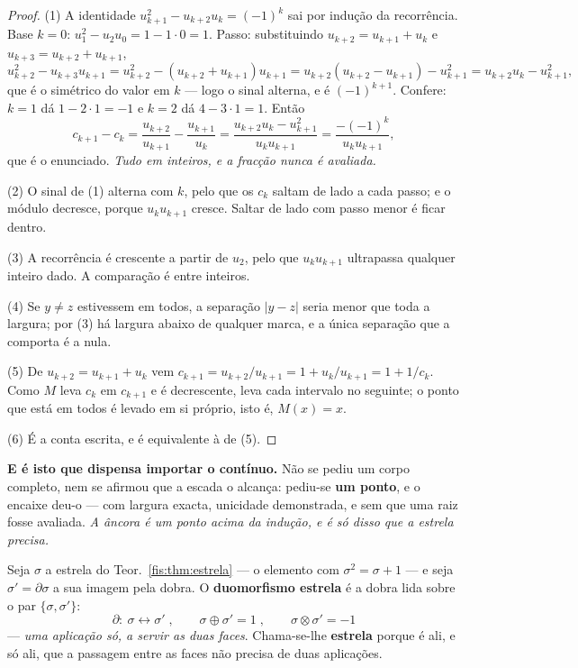 \documentclass[livro.tex]{subfiles}
\begin{document}
\begin{proof}
(1) A identidade $u_{k+1}^{2}-u_{k+2}u_{k}=(-1)^{k}$ sai por indução da
recorrência. Base $k=0$: $u_1^{2}-u_2u_0=1-1\cdot0=1$. Passo: substituindo
$u_{k+2}=u_{k+1}+u_k$ e $u_{k+3}=u_{k+2}+u_{k+1}$,
\[
u_{k+2}^{2}-u_{k+3}u_{k+1}=u_{k+2}^{2}-(u_{k+2}+u_{k+1})u_{k+1}
=u_{k+2}(u_{k+2}-u_{k+1})-u_{k+1}^{2}=u_{k+2}u_{k}-u_{k+1}^{2},
\]
que é o simétrico do valor em $k$ --- logo o sinal alterna, e é $(-1)^{k+1}$.
Confere: $k=1$ dá $1-2\cdot1=-1$ e $k=2$ dá $4-3\cdot1=1$. Então
\[
c_{k+1}-c_{k}=\frac{u_{k+2}}{u_{k+1}}-\frac{u_{k+1}}{u_{k}}
=\frac{u_{k+2}u_{k}-u_{k+1}^{2}}{u_{k}u_{k+1}}
=\frac{-(-1)^{k}}{u_{k}u_{k+1}} ,
\]
que é o enunciado. \emph{Tudo em inteiros, e a fracção nunca é avaliada.}

(2) O sinal de (1) alterna com $k$, pelo que os $c_k$ saltam de lado a cada
passo; e o módulo decresce, porque $u_ku_{k+1}$ cresce. Saltar de lado com passo
menor é ficar dentro.

(3) A recorrência é crescente a partir de $u_2$, pelo que $u_ku_{k+1}$ ultrapassa
qualquer inteiro dado. A comparação é entre inteiros.

(4) Se $y\neq z$ estivessem em todos, a separação $|y-z|$ seria menor que toda a
largura; por (3) há largura abaixo de qualquer marca, e a única separação que a
comporta é a nula.

(5) De $u_{k+2}=u_{k+1}+u_k$ vem
$c_{k+1}=u_{k+2}/u_{k+1}=1+u_k/u_{k+1}=1+1/c_k$. Como $M$ leva $c_k$ em
$c_{k+1}$ e é decrescente, leva cada intervalo no seguinte; o ponto que está em
todos é levado em si próprio, isto é, $M(x)=x$.

(6) É a conta escrita, e é equivalente à de (5).
\end{proof}

\medskip\noindent\textbf{E é isto que dispensa importar o contínuo.} Não se pediu
um corpo completo, nem se afirmou que a escada o alcança: pediu-se \textbf{um
ponto}, e o encaixe deu-o --- com largura exacta, unicidade demonstrada, e sem
que uma raiz fosse avaliada. \emph{A âncora é um ponto acima da indução, e é só
disso que a estrela precisa.}

\begin{definicao}\label{fis:def:duoestrela}
Seja $\sigma$ a estrela do Teor.~\ref{fis:thm:estrela} --- o elemento com
$\sigma^{2}=\sigma+1$ --- e seja $\sigma'=\partial\sigma$ a sua imagem pela
dobra. O \textbf{duomorfismo estrela} é a dobra lida sobre o par
$\{\sigma,\sigma'\}$:
\[
\boxed{\;\partial\colon\ \sigma\longleftrightarrow\sigma'\;,\qquad
\sigma\oplus\sigma'=1\;,\qquad \sigma\otimes\sigma'=-1\;}
\]
--- \emph{uma aplicação só, a servir as duas faces}. Chama-se-lhe \textbf{estrela}
porque é ali, e só ali, que a passagem entre as faces não precisa de duas
aplicações.
\end{definicao}
\end{document}
